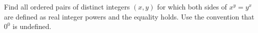 Find all ordered pairs of distinct integers $(x,y)$ for which both sides of $x^y=y^x$ are defined as real integer powers and the equality holds. Use the convention that $0^0$ is undefined.
